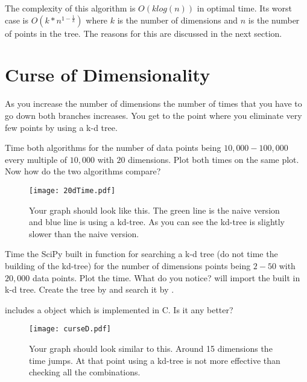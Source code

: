 The complexity of this algorithm is $O(klog(n))$ in optimal time.
Its worst case is $O(k*n^{1-\frac{1}{k}})$ where $k$ is the number of dimensions and $n$ is the number of points in the tree.
The reasons for this are discussed in the next section.

\section*{Curse of Dimensionality}

As you increase the number of dimensions the number of times that you have to go down both branches increases.
You get to the point where you eliminate very few points by using a k-d tree.

\begin{problem}
Time both algorithms for the number of data points being $10,000-100,000$ every multiple of $10,000$ with $20$ dimensions.
Plot both times on the same plot. Now how do the two algorithms compare?
\end{problem}

\begin{figure}[H]
\texttt{[image: 20dTime.pdf]}
\caption{
Your graph should look like this.
The green line is the naive version and blue line is using a kd-tree.
As you can see the kd-tree is slightly slower than the naive version.}
\end{figure}

\begin{problem}
Time the SciPy built in function for searching a k-d tree (do not time the building of the kd-tree) for the number of dimensions points being $2-50$ with $20,000$ data points.
Plot the time.
What do you notice?
 will import the built in k-d tree.
Create the tree by  and search it by .

 includes a  object which is implemented in C.
Is it any better?

\end{problem}
\begin{figure}[h!]
\texttt{[image: curseD.pdf]}
\caption{
Your graph should look similar to this.
Around 15 dimensions the time jumps.
At that point using a kd-tree is not more effective than checking all the combinations.}
\end{figure}


